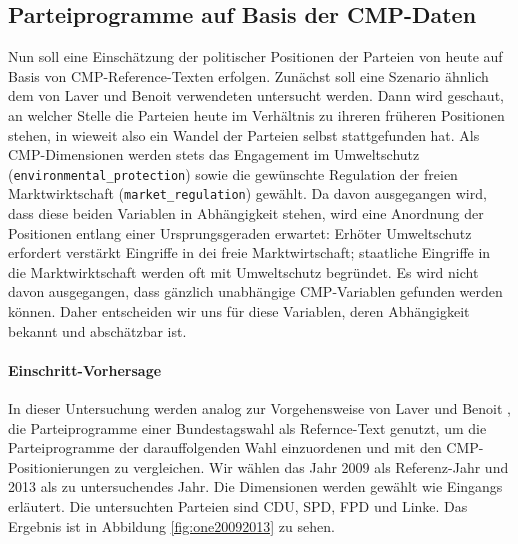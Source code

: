     
    \subsection{Parteiprogramme auf Basis der CMP-Daten}
    Nun soll eine Einschätzung der politischer Positionen der Parteien von heute auf Basis von CMP-Reference-Texten erfolgen. 
    Zunächst soll eine Szenario ähnlich dem von Laver und Benoit verwendeten untersucht werden. 
    Dann wird geschaut, an welcher Stelle die Parteien heute im Verhältnis zu ihreren früheren Positionen stehen, in wieweit also ein Wandel der Parteien selbst stattgefunden hat. 
    Als CMP-Dimensionen werden stets das Engagement im Umweltschutz \linebreak (\verb|environmental_protection|) sowie die gewünschte Regulation der freien Marktwirktschaft (\verb|market_regulation|) gewählt. Da davon ausgegangen wird, dass diese beiden Variablen in Abhängigkeit stehen, wird eine Anordnung der Positionen entlang einer Ursprungsgeraden erwartet: Erhöter Umweltschutz erfordert verstärkt Eingriffe in dei freie Marktwirtschaft; staatliche Eingriffe in die Marktwirktschaft werden oft mit Umweltschutz begründet. Es wird nicht davon ausgegangen, dass gänzlich unabhängige CMP-Variablen gefunden werden können. Daher entscheiden wir uns für diese Variablen, deren Abhängigkeit bekannt und abschätzbar ist.
    
    \paragraph{Einschritt-Vorhersage}
    In dieser Untersuchung werden analog zur Vorgehensweise von Laver und Benoit \cite{LuB}, die Parteiprogramme einer Bundestagswahl als Refernce-Text genutzt, um die Parteiprogramme der darauffolgenden Wahl einzuordenen und mit den CMP-Positionierungen zu vergleichen. 
    Wir wählen das Jahr 2009 als Referenz-Jahr und 2013 als zu untersuchendes Jahr. Die Dimensionen werden gewählt wie Eingangs erläutert. Die untersuchten Parteien sind CDU, SPD, FPD und Linke. Das Ergebnis ist in Abbildung \ref{fig:one20092013} zu sehen.
    
